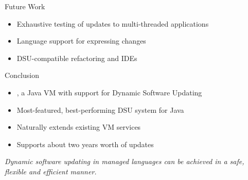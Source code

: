 \begin{frame}{Future Work}%
\begin{itemize}
\item Exhaustive testing of updates to multi-threaded applications
\item Language support for expressing changes
\item DSU-compatible refactoring and IDEs
\end{itemize}
\end{frame}

\begin{frame}{Conclusion}%
\begin{itemize}
\item \DSU{}, a Java VM with support for Dynamic Software Updating
\item Most-featured, best-performing DSU system for Java
\item Naturally extends existing VM services
\item Supports about two years worth of updates
\end{itemize}
\begin{block}{}
\emph{Dynamic software updating in managed languages can be achieved in a
safe, flexible and efficient manner.}
\end{block}
\begin{center}
\end{center}
\end{frame}

